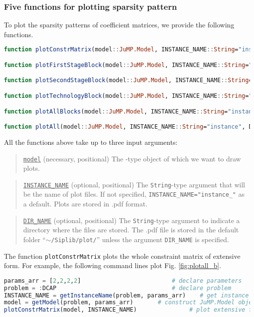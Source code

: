 \subsubsection{Five functions for plotting sparsity pattern}
To plot the sparsity patterns of coefficient matrices, we provide the following functions.
\begin{lstlisting}[frame=single,language=julia]
function plotConstrMatrix(model::JuMP.Model, INSTANCE_NAME::String="instance", DIR_NAME::String="$(dirname(@__FILE__))/../plot")

function plotFirstStageBlock(model::JuMP.Model, INSTANCE_NAME::String="instance_block_A", DIR_NAME::String="$(dirname(@__FILE__))/../plot")

function plotSecondStageBlock(model::JuMP.Model, INSTANCE_NAME::String="instance_block_W", DIR_NAME::String="$(dirname(@__FILE__))/../plot")

function plotTechnologyBlock(model::JuMP.Model, INSTANCE_NAME::String="instance_block_T", DIR_NAME::String="$(dirname(@__FILE__))/../plot")

function plotAllBlocks(model::JuMP.Model, INSTANCE_NAME::String="instance", DIR_NAME::String="$(dirname(@__FILE__))/../plot")

function plotAll(model::JuMP.Model, INSTANCE_NAME::String="instance", DIR_NAME::String="$(dirname(@__FILE__))/../plot")
\end{lstlisting}
All the functions above take up to three input arguments:
\begin{quote}
	\noindent\underline{\texttt{model}} (necessary, positional) The \jumpmodel-type object of which we want to draw plots.
\end{quote}

\begin{quote}
	\noindent\underline{\texttt{INSTANCE\_NAME}} (optional, positional) The \texttt{String}-type argument that will be the name of plot files. If not specified, \texttt{INSTANCE\_NAME="instance\_"} as a default. Plots are stored in .pdf format.
\end{quote}

\begin{quote}
	\noindent\underline{\texttt{DIR\_NAME}} (optional, positional) The \texttt{String}-type argument to indicate a directory where the files are stored. The .pdf file is stored in the default folder ``\texttt{$\sim$/Siplib/plot/}'' unless the argument \texttt{DIR\_NAME} is specified.
\end{quote}
The function \texttt{plotConstrMatrix} plots the whole constraint matrix of extensive form. For example, the following command lines plot Fig. \ref{fig:plotall_b}.
\begin{lstlisting}[frame=single,language=julia]
params_arr = [2,2,2,2]	                        # declare parameters
problem = :DCAP	                                # declare problem
INSTANCE_NAME = getInstanceName(problem, params_arr)	# get instance name
model = getModel(problem, params_arr)	    # construct JuMP.Model object
plotConstrMatrix(model, INSTANCE_NAME)               # plot extensive form constraint matrix   
\end{lstlisting}

